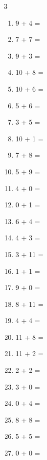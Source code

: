 \documentclass[a4paper, 11pt]{article}
\begin{document}
\begin{multicols}{3}
\begin{enumerate}
      \item 9 + 4 = \dotfill\bigskip
      \item 7 + 7 = \dotfill\bigskip
      \item 9 + 3 = \dotfill\bigskip
      \item 10 + 8 = \dotfill\bigskip
      \item 10 + 6 = \dotfill\bigskip
      \item 5 + 6 = \dotfill\bigskip
      \item 3 + 5 = \dotfill\bigskip
      \item 10 + 1 = \dotfill\bigskip
      \item 7 + 8 = \dotfill
      \item 5 + 9 = \dotfill\bigskip
      \item 4 + 0 = \dotfill\bigskip
      \item 0 + 1 = \dotfill\bigskip
      \item 6 + 4 = \dotfill\bigskip
      \item 4 + 3 = \dotfill\bigskip
      \item 3 + 11 = \dotfill\bigskip
      \item 1 + 1 = \dotfill\bigskip
      \item 9 + 0 = \dotfill\bigskip
      \item 8 + 11 = \dotfill\bigskip
      \item 4 + 4 = \dotfill\bigskip
      \item 11 + 8 = \dotfill\bigskip
      \item 11 + 2 = \dotfill\bigskip
      \item 2 + 2 = \dotfill\bigskip
      \item 3 + 0 = \dotfill\bigskip
      \item 0 + 4 = \dotfill\bigskip
      \item 8 + 8 = \dotfill\bigskip
      \item 5 + 5 = \dotfill\bigskip
      \item 0 + 0 = \dotfill
    \end{enumerate}
\end{multicols}
\end{document}
